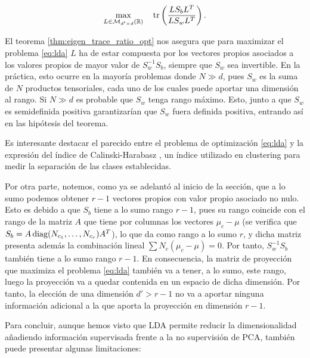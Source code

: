 \documentclass{book}
\begin{document}
\begin{equation} \label{eq:lda}
	\max_{\substack{L \in \mathcal{M}_{d'\times d}(\mathbb{R}) }} \quad \operatorname{tr}\left(\frac{L S_b L^T}{LS_wL^T}\right).
\end{equation}


El teorema \ref{thm:eigen_trace_ratio_opt} nos asegura que para maximizar el problema \ref{eq:lda} $L$ ha de estar compuesta por los vectores propios asociados a los valores propios de mayor valor de $S_w^{-1}S_b$, siempre que $S_w$ sea invertible. En la práctica, esto ocurre en la mayoría problemas donde $N \gg d$, pues $S_w$ es la suma de $N$ productos tensoriales, cada uno de los cuales puede aportar una dimensión al rango. Si $N \gg d$ es probable que $S_w$ tenga rango máximo. Esto, junto a que $S_w$ es semidefinida positiva garantizarían que $S_w$ fuera definida positiva, entrando así en las hipótesis del teorema.

Es interesante destacar el parecido entre el problema de optimización \ref{eq:lda} y la expresión del índice de Calinski-Harabasz \cite{maulik2002performance}, un índice utilizado en clustering para medir la separación de las clases establecidas.

Por otra parte, notemos, como ya se adelantó al inicio de la sección, que a lo sumo podemos obtener $r-1$ vectores propios con valor propio asociado no nulo. Esto es debido a que $S_b$ tiene a lo sumo rango $r-1$, pues su rango coincide con el rango de la matriz $A$ que tiene por columnas los vectores $\mu_c - \mu$ (se verifica que $S_b = A \operatorname{diag}(N_{c_1},\dots,N_{c_r}) A^T$), lo que da como rango a lo sumo $r$, y dicha matriz presenta además la combinación lineal $\sum N_c(\mu_c- \mu) = 0$. Por tanto, $S_w^{-1}S_b$ también tiene a lo sumo rango $r-1$. En consecuencia, la matriz de proyección que maximiza el problema \ref{eq:lda} también va a tener, a lo sumo, este rango, luego la proyección va a quedar contenida en un espacio de dicha dimensión. Por tanto, la elección de una dimensión $d' > r-1$ no va a aportar ninguna información adicional a la que aporta la proyección en dimensión $r-1$.

Para concluir, aunque hemos visto que LDA permite reducir la dimensionalidad añadiendo información supervisada frente a la no supervisión de PCA, también puede presentar algunas limitaciones:
\end{document}
